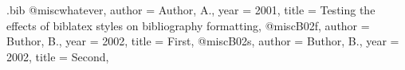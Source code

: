 
\begin{filecontents}{\jobname.bib}
@misc{whatever,
  author = {Author, A.},
  year = {2001},
  title = {Testing the effects of biblatex styles on bibliography formatting},
}
@misc{B02f,
  author = {Buthor, B.},
  year = {2002},
  title = {First},
}
@misc{B02s,
  author = {Buthor, B.},
  year = {2002},
  title = {Second},
}	
\end{filecontents}
